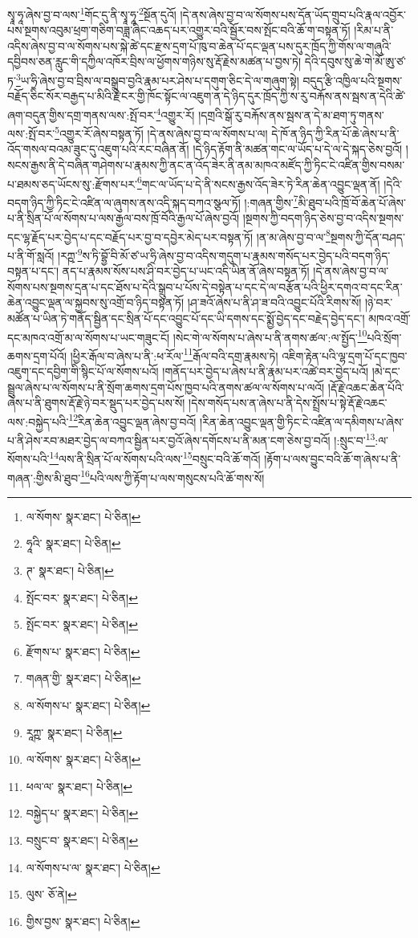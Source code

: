 སྭཱ་ཧཱ་ཞེས་བྱ་བ་ལས་\footnote{ལ་སོགས་  སྣར་ཐང་།  པེ་ཅིན། }གོང་དུ་ནི་སྭཱ་ཧཱ་\footnote{ཧཱའི་  སྣར་ཐང་།  པེ་ཅིན། }སྔོན་དུའོ། །དེ་ནས་ཞེས་བྱ་བ་ལ་སོགས་པས་དོན་ཡོད་གྲུབ་པའི་རྣལ་འབྱོར་པས་སྔགས་འབུམ་ཕྲག་གཅིག་བཟླ་ཞིང་འཆད་པར་འགྱུར་བའི་སྦྱོར་བས་སྤོང་བའི་ཆོ་ག་བསྟན་ཏོ། །རིམ་པ་ནི་འདིས་ཞེས་བྱ་བ་ལ་སོགས་པས་སྐེ་ཚེ་དང་རྫས་དྲག་པོ་ཁུ་བ་ཆེན་པོ་དང་ལྡན་པས་དུར་ཁྲོད་ཀྱི་གོས་ལ་གཞུའི་དབྱིབས་ཅན་རླུང་གི་དཀྱིལ་འཁོར་བྲིས་ལ་ཕྱོགས་གཉིས་སུ་རྡོ་རྗེས་མཚན་པ་བྱས་ཏེ། དེའི་དབུས་སུ་ཆེ་གེ་མོ་ཨུ་ཙ་ཏ་\footnote{ཊ་  སྣར་ཐང་།  པེ་ཅིན། }ཡ་ཧྲི་ཞེས་བྱ་བ་བྲིས་ལ་བསྒྲུབ་བྱའི་རྣམ་པར་ཤེས་པ་དགུག་ཅིང་དེ་ལ་གཞུག་སྟེ། བདུད་རྩི་འཁྱིལ་པའི་སྔགས་བརྗོད་ཅིང་སོར་བརྒྱད་པ་མིའི་རྗེ་ངར་གྱི་ཁོང་སྟོང་ལ་འཇུག་ན་དེ་ཉིད་དུར་ཁྲོད་ཀྱི་ས་རུ་བརྐོས་ནས་སྦས་ན་དེའི་ཚེ་ཞག་བདུན་གྱིས་དགྲ་གནས་ལས་:སྤོ་བར་\footnote{སྤོང་བར་  སྣར་ཐང་།  པེ་ཅིན། }འགྱུར་རོ། །དགྲའི་སྒོ་རུ་བརྐོས་ནས་སྦས་ན་དེ་མ་ཐག་ཏུ་གནས་ལས་:སྤོ་བར་\footnote{སྤོང་བར་  སྣར་ཐང་།  པེ་ཅིན། }འགྱུར་རོ་ཞེས་བསྟན་ཏོ། །དེ་ནས་ཞེས་བྱ་བ་ལ་སོགས་པ་ལ། དེ་ཁོ་ན་ཉིད་ཀྱི་རིན་པོ་ཆེ་ཞེས་པ་ནི་འོད་གསལ་བའམ་ཟུང་དུ་འཇུག་པའི་རང་བཞིན་ནོ། །དེ་ཉིད་རྟོག་ནི་མཚན་གང་ལ་ཡོད་པ་དེ་ལ་དེ་སྐད་ཅེས་བྱའོ། །སངས་རྒྱས་ནི་དེ་བཞིན་གཤེགས་པ་རྣམས་ཀྱི་ནང་ན་འོད་ཟེར་ནི་ནམ་མཁའ་མཛོད་ཀྱི་ཏིང་ངེ་འཛིན་གྱིས་བསམ་པ་ཐམས་ཅད་ཡོངས་སུ་:རྫོགས་པར་\footnote{རྫོགས་པ་  སྣར་ཐང་།  པེ་ཅིན། }གང་ལ་ཡོད་པ་དེ་ནི་སངས་རྒྱས་འོད་ཟེར་ཏེ་རིན་ཆེན་འབྱུང་ལྡན་ནོ། །དེའི་བདག་ཉིད་ཀྱི་ཏིང་ངེ་འཛིན་ལ་ཞུགས་ནས་འདི་སྐད་བཀའ་སྩལ་ཏོ། །:གཞན་གྱིས་\footnote{གཞན་གྱི་  སྣར་ཐང་།  པེ་ཅིན། }མི་ཐུབ་པའི་ཁྲོ་བོ་ཆེན་པོ་ཞེས་པ་ནི་སྲིན་པོ་ལ་སོགས་པ་ལས་རྒྱལ་བས་ཁྲོ་བོའི་རྒྱལ་པོ་ཞེས་བྱའོ། །སྔགས་ཀྱི་བདག་ཉིད་ཅེས་བྱ་བ་འདིས་སྔགས་དང་ལྷ་རྗོད་པར་བྱེད་པ་དང་བརྗོད་པར་བྱ་བ་དབྱེར་མེད་པར་བསྟན་ཏོ། །ན་མ་ཞེས་བྱ་བ་ལ་\footnote{ལ་སོགས་པ་  སྣར་ཐང་།  པེ་ཅིན། }སྔགས་ཀྱི་དོན་བཤད་པ་ནི་གོ་སླའོ། །རཀྵ་\footnote{རཱཀྵ་  སྣར་ཐང་།  པེ་ཅིན། }ས་ཏི་བྷྱོ་བི་མོ་ཙ་ཡ་ཧྲི་ཞེས་བྱ་བ་འདིས་གདུག་པ་རྣམས་གསོད་པར་བྱེད་པའི་བདག་ཉིད་བསྟན་པ་དང་། ནད་པ་རྣམས་སོས་པས་ཤི་བར་བྱེད་པ་ཡང་འདི་ཡིན་ནོ་ཞེས་བསྟན་ཏོ། །དེ་ནས་ཞེས་བྱ་བ་ལ་སོགས་པས་སྔགས་དྲན་པ་དང་ཐོས་པ་དེའི་སྒྲུབ་པ་པོས་དེ་བསྟེན་པ་དང་དེ་ལ་བརྩོན་པའི་ཕྱིར་དགའ་བ་དང་རིན་ཆེན་འབྱུང་ལྡན་ལ་སྐྱབས་སུ་འགྲོ་བ་ཉིད་བསྟན་ཏོ། །ཤ་ཟའོ་ཞེས་པ་ནི་ཤ་ཟ་བའི་འབྱུང་པོའི་རིགས་སོ། །ཉེ་བར་མཚོན་པ་ཡིན་ཏེ་གནོད་སྦྱིན་དང་སྲིན་པོ་དང་འབྱུང་པོ་དང་ཡི་དགས་དང་སྨྱོ་བྱེད་དང་བརྗེད་བྱེད་དང་། མཁའ་འགྲོ་དང་མཁའ་འགྲོ་མ་ལ་སོགས་པ་ཡང་གཟུང་ངོ། །སེང་གེ་ལ་སོགས་པ་ཞེས་པ་ནི་ནགས་ཚལ་:ལ་སྤྱོད་\footnote{ལ་སོགས་  སྣར་ཐང་།  པེ་ཅིན། }པའི་སྲོག་ཆགས་དྲག་པོའོ། །ཕྱིར་རྒོལ་བ་ཞེས་པ་ནི་:ཕ་རོལ་\footnote{ཕལ་ལ་  སྣར་ཐང་།  པེ་ཅིན། }རྒོལ་བའི་དགྲ་རྣམས་ཏེ། འཇིག་རྟེན་པའི་ལྷ་དྲག་པོ་དང་ཁྱབ་འཇུག་དང་དབྱིག་གི་སྙིང་པོ་ལ་སོགས་པའོ། །གནོད་པར་བྱེད་པ་ཞེས་པ་ནི་རྣམ་པར་འཚེ་བར་བྱེད་པའོ། །མེ་དང་སྦྲུལ་ཞེས་པ་ལ་སོགས་པ་ནི་སྲོག་ཆགས་དྲག་པོས་ཁྱབ་པའི་ནགས་ཚལ་ལ་སོགས་པ་ལའོ། །རྡོ་རྗེ་འཆང་ཆེན་པོའི་ཞེས་པ་ནི་ཐུགས་རྡོ་རྗེ་ཉེ་བར་སྡུད་པར་བྱེད་པས་སོ། །དེས་གསོད་པས་ན་ཞེས་པ་ནི་དེས་སྤྲོས་པ་སྟེ་རྡོ་རྗེ་འཆང་ལས་:བསྐྱེད་པའི་\footnote{བསྐྱེད་པ་  སྣར་ཐང་།  པེ་ཅིན། }རིན་ཆེན་འབྱུང་ལྡན་ཞེས་བྱ་བའོ། །རིན་ཆེན་འབྱུང་ལྡན་གྱི་ཏིང་ངེ་འཛིན་ལ་དམིགས་པ་ཞེས་པ་ནི་ཤེས་རབ་མཐར་བྱེད་ལ་བཀའ་སྦྱིན་པར་བྱའོ་ཞེས་དགོངས་པ་ནི་མན་ངག་ཅེས་བྱ་བའོ། །:སྲུང་བ་\footnote{བསྲུང་བ་  སྣར་ཐང་།  པེ་ཅིན། }:ལ་སོགས་པའི་\footnote{ལ་སོགས་པ་ལ་  སྣར་ཐང་།  པེ་ཅིན། }ལས་ནི་སྲིན་པོ་ལ་སོགས་པའི་ལས་\footnote{ལུས་  ཅོ་ནེ། }བསྲུང་བའི་ཆོ་གའོ། །རྟོག་པ་ལས་བྱུང་བའི་ཆོ་ག་ཞེས་པ་ནི་གཞན་:གྱིས་མི་ཐུབ་\footnote{གྱིས་བྱས་  སྣར་ཐང་།  པེ་ཅིན། }པའི་ལས་ཀྱི་རྟོག་པ་ལས་གསུངས་པའི་ཆོ་གས་སོ། 